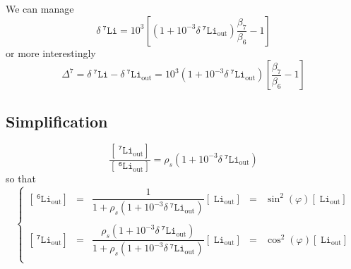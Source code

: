 \documentclass[aps,onecolumn,12pt]{revtex4}
\newcommand{\mychem}[1]{\mathtt{#1}}
\newcommand{\myconc}[1]{\left\lbrack{#1}\right\rbrack}
\newcommand{\spLi}[1]{{~^{\mychem{#1}}\mychem{Li}}}
\newcommand{\spLiOut}[1]{{\spLi{#1}}_{\mathrm{out}}}
\newcommand{\LiOut}[1]{\myconc{\spLiOut{#1}}}
\newcommand{\deltaLi}{ {\delta\!\!\!\spLi{7}} }
\newcommand{\deltaLiOut}{{\deltaLi}_{\mathrm{out}}}
\begin{document}
We can manage
\begin{equation}
	\deltaLi = 10^3 \left[ \left(1+10^{-3}\deltaLiOut\right)\dfrac{\beta_7}{\beta_6} - 1 \right] 
\end{equation}
or more interestingly
\begin{equation}
	\Delta^7 = \deltaLi - \deltaLiOut = 10^3 \left(1+10^{-3}\deltaLiOut\right) \left[\dfrac{\beta_7}{\beta_6} - 1\right]
\end{equation}

\subsection{Simplification}
\begin{equation}
	\dfrac{\LiOut{7}}{\LiOut{6}} = \rho_s \left(1+10^{-3}\deltaLiOut\right)
\end{equation}
so that
\begin{equation}
\left\lbrace
	\begin{array}{rclcl}
	\LiOut{6} & = & \dfrac{1}{1+\rho_s\left(1+10^{-3}\deltaLiOut\right)} \LiOut{} & = & \sin^2(\varphi) \LiOut{} \\
	\\
	\LiOut{7} & = & \dfrac{\rho_s\left(1+10^{-3}\deltaLiOut\right)}{1+\rho_s\left(1+10^{-3}\deltaLiOut\right)} \LiOut{} & = & \cos^2(\varphi)\LiOut{} \\
	\end{array}
\right.
\end{equation}
\end{document}
